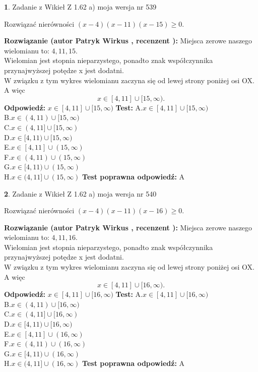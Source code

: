 \documentclass[12pt, a4paper]{article}
\theoremstyle{definition} %
\newtheorem{zad}{}
\newcommand{\zadStart}[1]{\begin{zad}#1\newline}
\newcommand{\zadStop}{\end{zad}}
\newcommand{\rozwStart}[2]{\noindent \textbf{Rozwiązanie (autor #1 , recenzent #2): }\newline}
\newcommand{\rozwStop}{\newline}
\newcommand{\odpStart}{\noindent \textbf{Odpowiedź:}\newline}
\newcommand{\odpStop}{\newline}
\newcommand{\testStart}{\noindent \textbf{Test:}\newline}
\newcommand{\testStop}{\newline}
\newcommand{\kluczStart}{\noindent \textbf{Test poprawna odpowiedź:}\newline}
\newcommand{\kluczStop}{\newline}
\begin{document}
\zadStart{Zadanie z Wikieł Z 1.62 a) moja wersja nr 539}

Rozwiązać nierówności $(x-4)(x-11)(x-15)\ge0$.
\zadStop
\rozwStart{Patryk Wirkus}{}
Miejsca zerowe naszego wielomianu to: $4, 11, 15$.\\
Wielomian jest stopnia nieparzystego, ponadto znak współczynnika przy\linebreak najwyższej potędze x jest dodatni.\\ W związku z tym wykres wielomianu zaczyna się od lewej strony poniżej osi OX. A więc $$x \in [4,11] \cup [15,\infty).$$
\rozwStop
\odpStart
$x \in [4,11] \cup [15,\infty)$
\odpStop
\testStart
A.$x \in [4,11] \cup [15,\infty)$\\
B.$x \in (4,11) \cup [15,\infty)$\\
C.$x \in (4,11] \cup [15,\infty)$\\
D.$x \in [4,11) \cup [15,\infty)$\\
E.$x \in [4,11] \cup (15,\infty)$\\
F.$x \in (4,11) \cup (15,\infty)$\\
G.$x \in [4,11) \cup (15,\infty)$\\
H.$x \in (4,11] \cup (15,\infty)$
\testStop
\kluczStart
A
\kluczStop



\zadStart{Zadanie z Wikieł Z 1.62 a) moja wersja nr 540}

Rozwiązać nierówności $(x-4)(x-11)(x-16)\ge0$.
\zadStop
\rozwStart{Patryk Wirkus}{}
Miejsca zerowe naszego wielomianu to: $4, 11, 16$.\\
Wielomian jest stopnia nieparzystego, ponadto znak współczynnika przy\linebreak najwyższej potędze x jest dodatni.\\ W związku z tym wykres wielomianu zaczyna się od lewej strony poniżej osi OX. A więc $$x \in [4,11] \cup [16,\infty).$$
\rozwStop
\odpStart
$x \in [4,11] \cup [16,\infty)$
\odpStop
\testStart
A.$x \in [4,11] \cup [16,\infty)$\\
B.$x \in (4,11) \cup [16,\infty)$\\
C.$x \in (4,11] \cup [16,\infty)$\\
D.$x \in [4,11) \cup [16,\infty)$\\
E.$x \in [4,11] \cup (16,\infty)$\\
F.$x \in (4,11) \cup (16,\infty)$\\
G.$x \in [4,11) \cup (16,\infty)$\\
H.$x \in (4,11] \cup (16,\infty)$
\testStop
\kluczStart
A
\kluczStop
\end{document}
